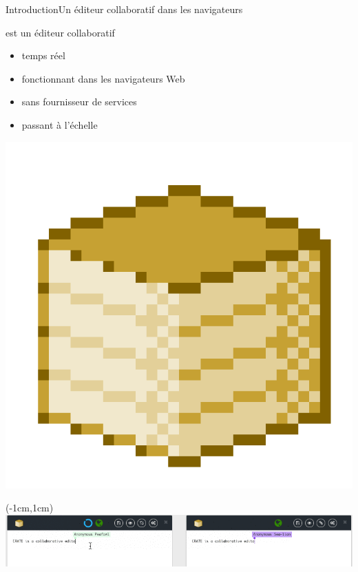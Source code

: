 \begin{frame}{Introduction}{Un éditeur collaboratif dans les navigateurs}
  

  \begin{minipage}{0.69\textwidth}
    \CRATE est un éditeur collaboratif 
    \begin{itemize}
    \item temps réel \YES{\cmark}
    \item fonctionnant dans les navigateurs Web \YES{\cmark}
    \item sans fournisseur de services \YES{\cmark}
    \item passant à l'échelle \YES{\cmark}
    \end{itemize}
  \end{minipage}
  \begin{minipage}{0.3\textwidth}
    \includegraphics[width=\textwidth,interpolate=false]{img/crateicon.png}
  \end{minipage}
    
  
  \begin{textblock*}{1.18\textwidth}(-1cm,1cm)
    \includegraphics[width=1\textwidth]{img/tmp-52.png}
  \end{textblock*}
  
  \vspace{1cm}

\end{frame}


